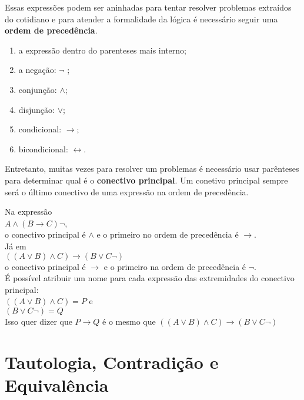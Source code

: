 Essas expressões podem ser aninhadas para tentar resolver problemas extraídos do cotidiano e para atender a formalidade da lógica é necessário seguir uma \textbf{ordem de precedência}.

\begin{enumerate}
	\item a expressão dentro do parenteses mais interno;
	\item a negação: $ \neg $ ;
	\item conjunção: $ \wedge $;
	\item disjunção: $ \vee $;
	\item condicional: $ \rightarrow; $
	\item bicondicional: $ \leftrightarrow $.
\end{enumerate}

Entretanto, muitas vezes para resolver um problemas é necessário usar parênteses para determinar qual é o \textbf{conectivo principal}. Um conetivo principal sempre será o último conectivo de uma expressão na ordem de precedência.

Na expressão \\

$ A \wedge (B \rightarrow C)\neg $, \\

o conectivo principal é $ \wedge $ e o primeiro no ordem de precedência é $ \rightarrow $. \\

Já em \\

$ ((A \vee B) \wedge C) \rightarrow (B \vee C\neg) $ \\

o conectivo principal é $ \rightarrow $ e o primeiro na ordem de precedência é $ \neg $. \\

É possível atribuir um nome para cada expressão das extremidades do conectivo principal: \\

$ ((A \vee B) \wedge C) = P $ e \\

$ (B \vee C\neg) = Q $ \\

Isso quer dizer que $ P \rightarrow Q $ é o mesmo que $ ((A \vee B) \wedge C) \rightarrow (B \vee C\neg) $

\section{Tautologia, Contradição e Equivalência}

